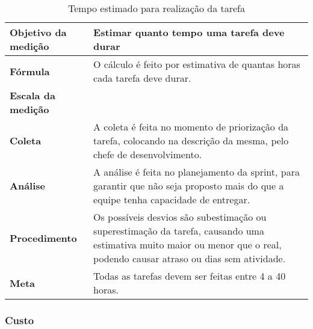 \begin{table}[H]
\centering
\begin{tabular}{|p{4cm}|p{5cm}|}
\hline
	\textbf{Objetivo da medição} &
	Estimar quanto tempo uma tarefa deve durar
	\\ \hline
	\textbf{Fórmula} &
	O cálculo é feito por estimativa de quantas horas cada tarefa deve durar.
	\\ \hline
	\textbf{Escala da medição} &

	\\ \hline
	\textbf{Coleta} &
	A coleta é feita no momento de priorização da tarefa, colocando na descrição da mesma, pelo chefe de desenvolvimento.
	\\ \hline
	\textbf{Análise} &
	A análise é feita no planejamento da sprint, para garantir que não seja proposto mais do que a equipe tenha capacidade de entregar.
	\\ \hline
	\textbf{Procedimento} &
	Os possíveis desvios são subestimação ou superestimação da tarefa, causando uma estimativa muito maior ou menor que o real, podendo causar atraso ou dias sem atividade.
	\\ \hline
  \textbf{Meta} &
	Todas as tarefas devem ser feitas entre 4 a 40 horas.
  \\ \hline
\end{tabular}
\caption{Tempo estimado para realização da tarefa}
\label{tab:tempo_estimado_realização_tarefa}
\end{table}

\subsubsection{Custo}


